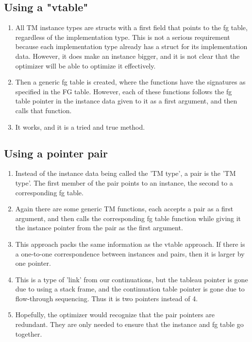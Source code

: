 \documentclass[11pt]{article}
\begin{document}
\subsection{Using a "vtable"}
\label{sec:orga3c331a}

\begin{enumerate}
\item All TM instance types are structs with a first field that points to the fg table,
regardless of the implementation type. This is not a serious requirement because
each implementation type already has a struct for its implementation data. However, it does make an instance bigger, and it is not clear that the optimizer will be able to
optimize it effectively.

\item Then a generic fg table is created, where the functions have the signatures as specified
in the FG table. However, each of these functions follows the fg table pointer in the
instance data given to it as a first argument, and then calls that function.

\item It works, and it is a tried and true method.
\end{enumerate}

\subsection{Using a pointer pair}
\label{sec:orgc9d996e}

\begin{enumerate}
\item Instead of the instance data being called the 'TM type', a pair is the 'TM type'.
The first member of the pair points to an instance, the second to a corresponding
fg table.

\item Again there are some generic TM functions, each accepts a pair as a first argument, and then calls the corresponding fg table function while giving it the instance pointer
from the pair as the first argument.

\item This approach packs the same information as the vtable approach. If there is a
one-to-one correspondence between instances and pairs, then it is larger by one pointer.

\item This is a type of 'link' from our continuations, but the tableau pointer is gone due
to using a stack frame, and the continuation table pointer is gone due to flow-through sequencing. Thus it is two pointers instead of 4.

\item Hopefully, the optimizer would recognize that the pair pointers are redundant. They are only needed to ensure that the instance and fg table go together.
\end{enumerate}
\end{document}
